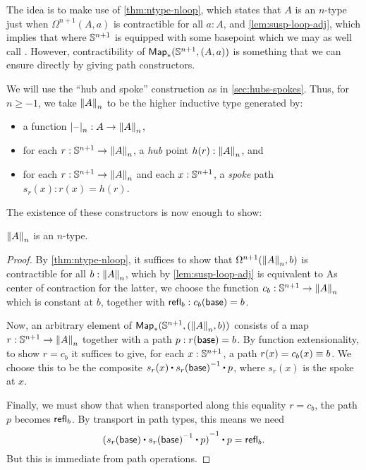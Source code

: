 The idea is to make use of \cref{thm:ntype-nloop}, which states that $A$ is an $n$-type just when $\Omega^{n+1}(A,a)$
%
is contractible for
all $a:A$, and \cref{lem:susp-loop-adj}, which implies that
 where $\Sn^{n+1}$ is equipp\-ed with some basepoint which we may as well call \base.
However, contractibility of $\Map_*(\Sn^{n+1},(A,a))$ is something that we can ensure directly by giving path constructors.

%
We will use the ``hub and spoke'' construction as in \cref{sec:hubs-spokes}.
Thus, for $n\ge -1$, we take $\trunc nA$ to be the higher inductive type generated by:
\begin{itemize}
\item a function $\tprojf n : A \to \trunc n A$,
\item for each $r:\Sn^{n+1} \to \trunc n A$, a \emph{hub} point $h(r):\trunc n A$, and
\item for each $r:\Sn^{n+1} \to \trunc n A$ and each $x:\Sn^{n+1}$, a \emph{spoke} path $s_r(x):r(x) = h(r)$.
\end{itemize}

\noindent
The existence of these constructors is now enough to show:

\begin{lem}
  $\trunc n A$ is an $n$-type.
\end{lem}
\begin{proof}
  By \cref{thm:ntype-nloop}, it suffices to show that $\Omega ^{n+1}(\trunc nA,b)$ is contractible for all $b:\trunc nA$, which by
\cref{lem:susp-loop-adj} is equivalent to 
  As center of contraction for the latter, we choose the function $c_b:\Sn^{n+1} \to \trunc nA$ which is constant at $b$, together with
$\refl b : c_b(\base) = b$.

  Now, an arbitrary element of $\Map_*(\Sn^{n+1},(\trunc nA,b))$ consists of a map $r:\Sn^{n+1} \to \trunc n A$ together with a path
$p:r(\base)=b$.
  By function extensionality, to show $r = c_b$ it suffices to give, for each $x:\Sn^{n+1}$, a path $r(x)=c_b(x) \jdeq b$.
  We choose this to be the composite $s_r(x) \ct \opp{s_r(\base)} \ct p$, where $s_r(x)$ is the spoke at $x$.


  Finally, we must show that when transported along this equality $r=c_b$, the path $p$ becomes $\refl b$.
  By transport in path types, this means we need
  \[\opp{(s_r(\base) \ct \opp{s_r(\base)} \ct p)} \ct p = \refl b.\]
  But this is immediate from path operations.
\end{proof}

